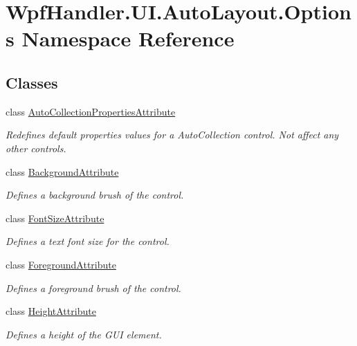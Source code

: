 \hypertarget{namespace_wpf_handler_1_1_u_i_1_1_auto_layout_1_1_options}{}\section{Wpf\+Handler.\+U\+I.\+Auto\+Layout.\+Options Namespace Reference}
\label{namespace_wpf_handler_1_1_u_i_1_1_auto_layout_1_1_options}
\subsection*{Classes}
\begin{DoxyCompactItemize}
\item 
class \mbox{\hyperlink{class_wpf_handler_1_1_u_i_1_1_auto_layout_1_1_options_1_1_auto_collection_properties_attribute}{Auto\+Collection\+Properties\+Attribute}}
\begin{DoxyCompactList}\small\item\em Redefines default properties values for a Auto\+Collection control. Not affect any other controls. \end{DoxyCompactList}\item 
class \mbox{\hyperlink{class_wpf_handler_1_1_u_i_1_1_auto_layout_1_1_options_1_1_background_attribute}{Background\+Attribute}}
\begin{DoxyCompactList}\small\item\em Defines a background brush of the control. \end{DoxyCompactList}\item 
class \mbox{\hyperlink{class_wpf_handler_1_1_u_i_1_1_auto_layout_1_1_options_1_1_font_size_attribute}{Font\+Size\+Attribute}}
\begin{DoxyCompactList}\small\item\em Defines a text font size for the control. \end{DoxyCompactList}\item 
class \mbox{\hyperlink{class_wpf_handler_1_1_u_i_1_1_auto_layout_1_1_options_1_1_foreground_attribute}{Foreground\+Attribute}}
\begin{DoxyCompactList}\small\item\em Defines a foreground brush of the control. \end{DoxyCompactList}\item 
class \mbox{\hyperlink{class_wpf_handler_1_1_u_i_1_1_auto_layout_1_1_options_1_1_height_attribute}{Height\+Attribute}}
\begin{DoxyCompactList}\small\item\em Defines a height of the G\+UI element. \end{DoxyCompactList}\item 

\end{DoxyCompactItemize}

